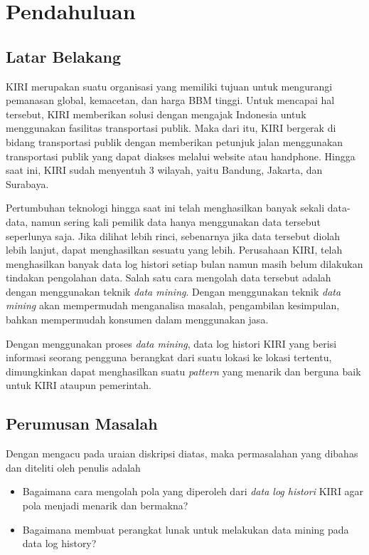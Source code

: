 \chapter{Pendahuluan}
\label{chap:intro}

\section{Latar Belakang}
\label{sec:motivation}

KIRI merupakan suatu organisasi yang memiliki tujuan untuk mengurangi pemanasan global, kemacetan, dan harga BBM tinggi. Untuk mencapai hal tersebut, KIRI memberikan solusi dengan mengajak Indonesia untuk menggunakan fasilitas transportasi publik. Maka dari itu, KIRI bergerak di bidang transportasi publik dengan memberikan petunjuk jalan menggunakan transportasi publik yang dapat diakses melalui website atau handphone. Hingga saat ini, KIRI sudah menyentuh 3 wilayah, yaitu Bandung, Jakarta, dan Surabaya.

Pertumbuhan teknologi hingga saat ini telah menghasilkan banyak sekali data-data, namun sering kali pemilik data hanya menggunakan data tersebut seperlunya saja. Jika dilihat lebih rinci, sebenarnya jika data tersebut diolah lebih lanjut, dapat menghasilkan sesuatu yang lebih. Perusahaan KIRI, telah menghasilkan banyak data log histori setiap bulan namun masih belum dilakukan tindakan pengolahan data. Salah satu cara mengolah data tersebut adalah dengan menggunakan teknik \textsl{data mining}. Dengan menggunakan teknik \textsl{data mining} akan mempermudah menganalisa masalah, pengambilan kesimpulan, bahkan mempermudah konsumen dalam menggunakan jasa.

Dengan menggunakan proses \textsl{data mining}, data log histori KIRI yang berisi informasi seorang pengguna berangkat dari suatu lokasi ke lokasi tertentu, dimungkinkan dapat menghasilkan suatu \textsl{pattern} yang menarik dan berguna baik untuk KIRI ataupun pemerintah. 

\section{Perumusan Masalah}
Dengan mengacu pada uraian diskripsi diatas, maka permasalahan yang dibahas dan diteliti oleh penulis adalah
\begin{itemize}
	\item Bagaimana cara mengolah pola yang diperoleh dari \textsl{data log histori}  KIRI agar pola menjadi menarik dan bermakna?
	\item Bagaimana membuat perangkat lunak untuk melakukan data mining pada data log history?
\end{itemize}

